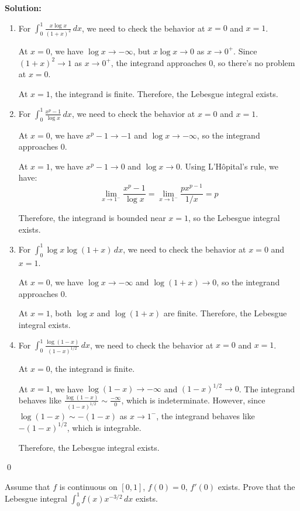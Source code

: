 \bigskip\noindent\textbf{Solution:}
\begin{enumerate}[label=(\alph*)]
\item For $\int_{0}^{1} \frac{x \log x}{(1 + x)^2} \, dx$, we need to check the behavior at $x = 0$ and $x = 1$.

At $x = 0$, we have $\log x \to -\infty$, but $x \log x \to 0$ as $x \to 0^+$. Since $(1 + x)^2 \to 1$ as $x \to 0^+$, the integrand approaches 0, so there's no problem at $x = 0$.

At $x = 1$, the integrand is finite. Therefore, the Lebesgue integral exists.

\item For $\int_{0}^{1} \frac{x^p - 1}{\log x} \, dx$, we need to check the behavior at $x = 0$ and $x = 1$.

At $x = 0$, we have $x^p - 1 \to -1$ and $\log x \to -\infty$, so the integrand approaches 0.

At $x = 1$, we have $x^p - 1 \to 0$ and $\log x \to 0$. Using L'Hôpital's rule, we have:
\[\lim_{x \to 1^-} \frac{x^p - 1}{\log x} = \lim_{x \to 1^-} \frac{px^{p-1}}{1/x} = p\]

Therefore, the integrand is bounded near $x = 1$, so the Lebesgue integral exists.

\item For $\int_{0}^{1} \log x \log (1 + x) \, dx$, we need to check the behavior at $x = 0$ and $x = 1$.

At $x = 0$, we have $\log x \to -\infty$ and $\log (1 + x) \to 0$, so the integrand approaches 0.

At $x = 1$, both $\log x$ and $\log (1 + x)$ are finite. Therefore, the Lebesgue integral exists.

\item For $\int_{0}^{1} \frac{\log (1 - x)}{(1 - x)^{1/2}} \, dx$, we need to check the behavior at $x = 0$ and $x = 1$.

At $x = 0$, the integrand is finite.

At $x = 1$, we have $\log (1 - x) \to -\infty$ and $(1 - x)^{1/2} \to 0$. The integrand behaves like $\frac{\log (1 - x)}{(1 - x)^{1/2}} \sim \frac{-\infty}{0}$, which is indeterminate. However, since $\log (1 - x) \sim -(1 - x)$ as $x \to 1^-$, the integrand behaves like $-(1 - x)^{1/2}$, which is integrable.

Therefore, the Lebesgue integral exists.
\end{enumerate}\qed


\begin{problembox}
Assume that $f$ is continuous on $[0, 1]$, $f(0) = 0$, $f'(0)$ exists. Prove that the Lebesgue integral $\int_{0}^{1} f(x)x^{-3/2} \, dx$ exists.
\end{problembox}

